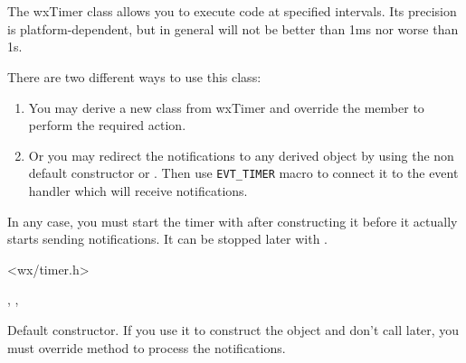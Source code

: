 \section{}\label{wxtimer}

The wxTimer class allows you to execute code at specified intervals. Its
precision is platform-dependent, but in general will not be better than 1ms nor
worse than 1s.

There are two different ways to use this class:

\begin{enumerate}
\item You may derive a new class from wxTimer and override the 
 member to perform the required action.
\item Or you may redirect the notifications to any 
 derived object by using the non default
constructor or . Then use {\tt EVT\_TIMER} 
macro to connect it to the event handler which will receive 
 notifications.
\end{enumerate}

In any case, you must start the timer with  
after constructing it before it actually starts sending notifications. It can
be stopped later with .




<wx/timer.h>


, , 


\label{wxtimerctordef}


Default constructor. If you use it to construct the object and don't call 
 later, you must override 
 method to process the notifications.

\label{wxtimerwxtimer}



